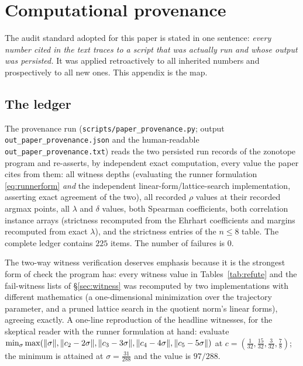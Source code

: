 
\section{Computational provenance}\label{sec:prov}

The audit standard adopted for this paper is stated in one sentence:
\emph{every number cited in the text traces to a script that was
actually run and whose output was persisted.} It was applied
retroactively to all inherited numbers and prospectively to all new
ones. This appendix is the map.

\subsection{The ledger}

The provenance run (\texttt{scripts/paper\_provenance.py}; output
\texttt{out\_paper\_provenance.json} and the human-readable
\texttt{out\_paper\_provenance.txt}) reads the two persisted run records
of the zonotope program and re-asserts, by independent exact
computation, every value the paper cites from them: all witness depths
(evaluating the runner formulation \eqref{eq:runnerform} \emph{and} the
independent linear-form/lattice-search implementation, asserting exact
agreement of the two), all recorded $\rho$ values at their recorded
argmax points, all $\lambda$ and $\delta$ values, both Spearman
coefficients, both correlation instance arrays (strictness recomputed
from the Ehrhart coefficients and margins recomputed from exact
$\lambda$), and the strictness entries of the $n\le8$ table. The
complete ledger contains $225$ items. The number of failures is $0$.

The two-way witness verification deserves emphasis because it is the
strongest form of check the program has: every witness value in
Tables~\ref{tab:refute} and the fail-witness lists of
\S\ref{sec:witness} was recomputed by two implementations with different
mathematics (a one-dimensional minimization over the trajectory
parameter, and a pruned lattice search in the quotient norm's linear
forms), agreeing exactly. A one-line reproduction of the headline
witnesses, for the skeptical reader with the runner formulation at
hand: evaluate
$\min_\sigma\max(\lVert \sigma \rVert,\lVert c_2-2\sigma \rVert,\lVert c_3-3\sigma \rVert,
\lVert c_4-4\sigma \rVert,\lVert c_5-5\sigma \rVert)$ at
$c=(\tfrac1{32},\tfrac{15}{32},\tfrac3{32},\tfrac78)$; the minimum is
attained at $\sigma=\tfrac{31}{288}$ and the value is $97/288$.

